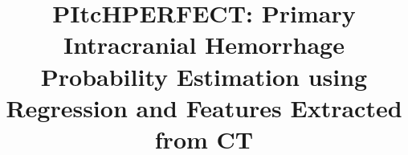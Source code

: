 \documentclass{elsarticle_nonatbib}\usepackage[]{graphicx}\usepackage[]{color}
\begin{document}
\renewcommand{\thesubfigure}{\Alph{subfigure}}

\begin{frontmatter}

\date{}

\title{PItcHPERFECT: Primary Intracranial Hemorrhage Probability Estimation using Regression and Features Extracted from CT}









\address[jhsph]{Department of Biostatistics, Bloomberg School of Public Health, Johns Hopkins University, Baltimore, MD, USA}
\address[jhmi]{Department of Neurology, Division of Brain Injury Outcomes,  Johns Hopkins Medical Institutions, Baltimore, MD, USA}
\address[ucla]{Department of Neurosurgery, David Geffen School of Medicine at UCLA, Los Angeles, CA, USA}


\begin{abstract}


\end{abstract}
\end{frontmatter}
\end{document}
